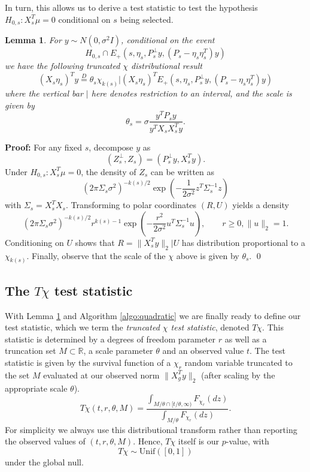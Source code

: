 \documentclass{imsart}
\newcommand{\real}{\mathbb{R}}
\newtheorem{lemma}[theorem]{Lemma}
\begin{document}
In turn, this allows us to derive a test statistic to test the hypothesis
$H_{0,s}:X_s^T\mu=0$ conditional on $s$ being selected.
\begin{lemma}
\label{eq:test:dbn}
For $y \sim N(0, \sigma^2 I)$,
conditional on the {\em event}
\[
H_{0,s} \cap E_+(s, \eta_s, P_s^{\perp}y, (P_s - \eta_s\eta_s^T)y)
\]
we have the following truncated $\chi$ distributional result
\begin{equation}
\label{eq:chi:truncated}
(X_s\eta_s)^Ty \overset{D}{=} \theta_s \chi_{k(s)} | (X_s\eta_s)^TE_+(s, \eta_s, P_s^{\perp}y, (P_s - \eta_s\eta_s^T)y) 
\end{equation}
where the vertical bar $|$ here denotes restriction to an interval, and the scale is given by
$$
\theta_s = \sigma \frac{y^TP_sy}{y^TX_sX_s^Ty}.
$$
\end{lemma}

{\bf Proof:}
For any fixed $s$, decompose $y$ as
$$
(Z^{\perp}_s,Z_s) = (P_s^{\perp}y, X_s^Ty).
$$
Under $H_{0,s}:X_s^T\mu=0$, the density of $Z_s$ can be written as
$$
(2 \pi \Sigma_s \sigma^2)^{-k(s)/2} \exp \left(-\frac{1}{2 \sigma^2} z^T\Sigma_s^{-1}z \right)
$$
with $\Sigma_s = X_s^TX_s$.
Transforming to polar coordinates $(R,U)$ yields a density
$$
(2 \pi \Sigma_s \sigma^2)^{-k(s)/2} r^{k(s)-1} \exp \left(-\frac{r^2}{2 \sigma^2} u^T\Sigma_s^{-1}u \right), \qquad r \geq 0, \|u\|_2=1.
$$
Conditioning on $U$ shows that $R=\|X_s^Ty\|_2|U$ has distribution proportional to a $\chi_{k(s)}$. Finally, observe that 
the scale of the $\chi$ above is given by $\theta_s$. \qed

\subsection{The $T\chi$ test statistic}

With Lemma \ref{eq:test:dbn} and Algorithm \ref{algo:quadratic} we are finally ready to define our test statistic, which we term the {\em truncated $\chi$ test statistic}, denoted $T\chi$. This statistic is determined by a degrees of freedom parameter $r$ as well as a truncation set $M \subset \real$, a scale parameter $\theta$ and an observed value $t$. The test statistic is given by the survival function of a $\chi_r$ random variable truncated to the set $M$ evaluated at our observed norm $\|X_g^Ty\|_2$ (after scaling by the appropriate scale $\theta$).
\begin{equation}
\label{eq:tchi}
T\chi(t, r, \theta,  M) = \frac{\int_{M /\theta \cap [t/\theta,\infty)} F_{\chi_r}(dz)}{\int_{M / \theta} F_{\chi_r}(dz)}.
\end{equation}
For simplicity we always use this distributional transform rather than reporting the observed values of $(t,r,\theta,M)$. Hence, $T\chi$ itself is our $p$-value, with
\[
T\chi \sim \text{Unif}([0,1])
\]
under the global null.
\end{document}
